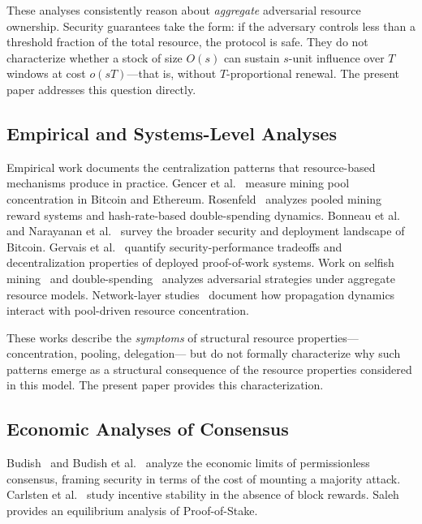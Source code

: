 \documentclass[manuscript,review]{acmart}
\theoremstyle{remark}
\begin{document}
	These analyses consistently reason about
	\emph{aggregate} adversarial resource ownership.
	Security guarantees take the form: if the adversary
	controls less than a threshold fraction of the total
	resource, the protocol is safe.
	They do not characterize whether a stock of size $O(s)$
	can sustain $s$-unit influence over $T$ windows at
	cost $o(sT)$---that is, without $T$-proportional renewal.
	The present paper addresses this question directly.
	
	\subsection{Empirical and Systems-Level Analyses}
	\label{ssec:rw_empirical}
	
	Empirical work documents the centralization patterns
	that resource-based mechanisms produce in practice.
	Gencer et al.~\cite{gencer2018decentralization} measure
	mining pool concentration in Bitcoin and Ethereum.
	Rosenfeld~\cite{rosenfeld2011analysis,rosenfeld2014analysis}
	analyzes pooled mining reward systems and hash-rate-based
	double-spending dynamics.
	Bonneau et al.~\cite{bonneau2015sok} and
	Narayanan et al.~\cite{narayanan2016bitcoinbook} survey
	the broader security and deployment landscape of Bitcoin.
	Gervais et al.~\cite{gervais2016security,gervais2014isbitcoin}
	quantify security-performance tradeoffs and decentralization
	properties of deployed proof-of-work systems.
	Work on selfish mining~\cite{eyal2014majority} and
	double-spending~\cite{kroll2013economics} analyzes
	adversarial strategies under aggregate resource models.
	Network-layer studies~\cite{neudecker2019network} document
	how propagation dynamics interact with pool-driven
	resource concentration.
	
	These works describe the \emph{symptoms} of structural
	resource properties---concentration, pooling, delegation---
	but do not formally characterize why such patterns emerge
	as a structural consequence of the resource properties
	considered in this model.
	The present paper provides this characterization.
	
	\subsection{Economic Analyses of Consensus}
	\label{ssec:rw_economic}
	
	Budish~\cite{budish2018economic} and
	Budish et al.~\cite{budish2024economic} analyze the
	economic limits of permissionless consensus, framing
	security in terms of the cost of mounting a majority attack.
	Carlsten et al.~\cite{carlsten2016instability} study
	incentive stability in the absence of block rewards.
	Saleh~\cite{saleh2021blockchain} provides an equilibrium
	analysis of Proof-of-Stake.
	
\end{document}
